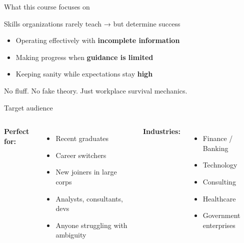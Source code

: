 \documentclass[aspectratio=169, 11pt]{beamer}
\begin{document}
	\begin{frame}{What this course focuses on}
		\begin{center}
			\large{Skills organizations rarely teach \quad → \quad but determine success}
		\end{center}
		\vspace{0.5cm}
		\begin{itemize}
			\item Operating effectively with \textbf{incomplete information}
			\item Making progress when \textbf{guidance is limited}
			\item Keeping sanity while expectations stay \textbf{high}
		\end{itemize}
		\vspace{0.3cm}
		\alert{No fluff. No fake theory. Just workplace survival mechanics.}
	\end{frame}
	
	\begin{frame}{Target audience}
		\begin{columns}[T]
			\textbf{Perfect for:}
			\begin{itemize}
				\item Recent graduates
				\item Career switchers
				\item New joiners in large corps
				\item Analysts, consultants, devs
				\item Anyone struggling with ambiguity
			\end{itemize}
			\textbf{Industries:}
			\begin{itemize}
				\item Finance / Banking
				\item Technology
				\item Consulting
				\item Healthcare
				\item Government  enterprises
			\end{itemize}
		\end{columns}
	\end{frame}
	
\end{document}
